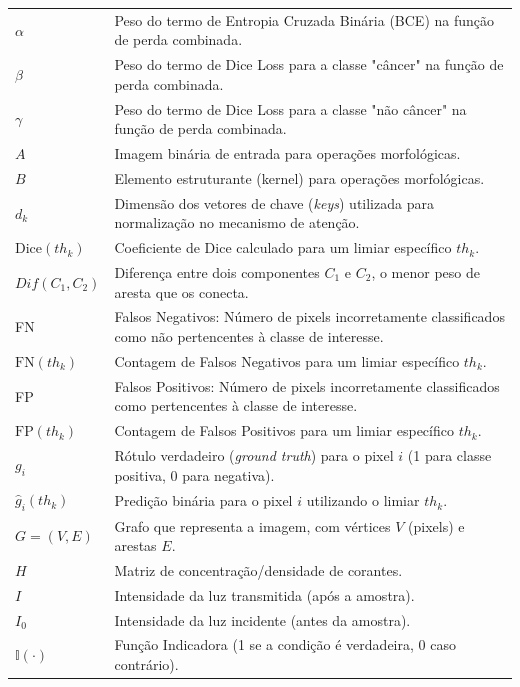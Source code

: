 \begin{longtable}{p{2.5cm} p{12.5cm}}
    $\alpha$  & Peso do termo de Entropia Cruzada Binária (BCE) na função de perda combinada. \\
    $\beta$   & Peso do termo de Dice Loss para a classe "câncer" na função de perda combinada. \\
    $\gamma$  & Peso do termo de Dice Loss para a classe "não câncer" na função de perda combinada. \\
    $A$       & Imagem binária de entrada para operações morfológicas. \\
    $B$       & Elemento estruturante (kernel) para operações morfológicas. \\
    $d_k$     & Dimensão dos vetores de chave (\textit{keys}) utilizada para normalização no mecanismo de atenção. \\
    $\text{Dice}(th_k)$ & Coeficiente de Dice calculado para um limiar específico $th_k$. \\
    $Dif(C_1, C_2)$ & Diferença entre dois componentes $C_1$ e $C_2$, o menor peso de aresta que os conecta. \\
    FN        & Falsos Negativos: Número de pixels incorretamente classificados como não pertencentes à classe de interesse. \\
    $\text{FN}(th_k)$ & Contagem de Falsos Negativos para um limiar específico $th_k$. \\
    FP        & Falsos Positivos: Número de pixels incorretamente classificados como pertencentes à classe de interesse. \\
    $\text{FP}(th_k)$ & Contagem de Falsos Positivos para um limiar específico $th_k$. \\
    $g_i$     & Rótulo verdadeiro (\textit{ground truth}) para o pixel $i$ (1 para classe positiva, 0 para negativa). \\
    $\hat{g}_{i}(th_k)$ & Predição binária para o pixel $i$ utilizando o limiar $th_k$. \\
    $G=(V, E)$ & Grafo que representa a imagem, com vértices $V$ (pixels) e arestas $E$. \\
    $H$       & Matriz de concentração/densidade de corantes. \\
    $I$       & Intensidade da luz transmitida (após a amostra). \\
    $I_0$     & Intensidade da luz incidente (antes da amostra). \\
    $\mathbb{I}(\cdot)$ & Função Indicadora (1 se a condição é verdadeira, 0 caso contrário). \\

\end{longtable}
